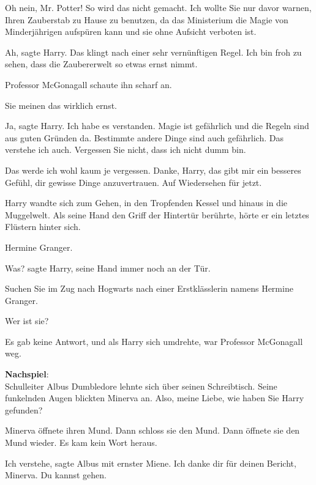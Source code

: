 \glqq{}Oh nein, Mr. Potter! So wird das nicht gemacht. Ich wollte Sie nur davor
warnen, Ihren Zauberstab zu Hause zu benutzen, da das Ministerium die Magie von
Minderjährigen aufspüren kann und sie ohne Aufsicht verboten ist.\grqq{}

\glqq{}Ah\grqq{}, sagte Harry. \glqq{}Das klingt nach einer sehr vernünftigen
Regel. Ich bin froh zu sehen, dass die Zaubererwelt so etwas ernst nimmt.\grqq{}

Professor McGonagall schaute ihn scharf an.

\glqq{}Sie meinen das wirklich ernst.\grqq{}

\glqq{}Ja\grqq{}, sagte Harry. \glqq{}Ich habe es verstanden. Magie ist
gefährlich und die Regeln sind aus guten Gründen da. Bestimmte andere Dinge sind
auch gefährlich. Das verstehe ich auch. Vergessen Sie nicht, dass ich nicht dumm
bin.\grqq{}

\glqq{}Das werde ich wohl kaum je vergessen. Danke, Harry, das gibt mir ein
besseres Gefühl, dir gewisse Dinge anzuvertrauen. Auf Wiedersehen für
jetzt.\grqq{}

Harry wandte sich zum Gehen, in den Tropfenden Kessel und hinaus in die
Muggelwelt. Als seine Hand den Griff der Hintertür berührte, hörte er ein
letztes Flüstern hinter sich.

\glqq{}Hermine Granger.\grqq{}

\glqq{}Was?\grqq{} sagte Harry, seine Hand immer noch an der Tür.

\glqq{}Suchen Sie im Zug nach Hogwarts nach einer Erstklässlerin namens Hermine
Granger.\grqq{}

\glqq{}Wer ist sie?\grqq{}

Es gab keine Antwort, und als Harry sich umdrehte, war Professor McGonagall weg.

\textbf{Nachspiel}:\\
Schulleiter Albus Dumbledore lehnte sich über seinen Schreibtisch. Seine
funkelnden Augen blickten Minerva an. \glqq{}Also, meine Liebe, wie haben Sie
Harry gefunden?\grqq{}

Minerva öffnete ihren Mund. Dann schloss sie den Mund. Dann öffnete sie den Mund
wieder. Es kam kein Wort heraus.

\glqq{}Ich verstehe\grqq{}, sagte Albus mit ernster Miene. \glqq{}Ich danke dir
für deinen Bericht, Minerva. Du kannst gehen.\grqq{}
